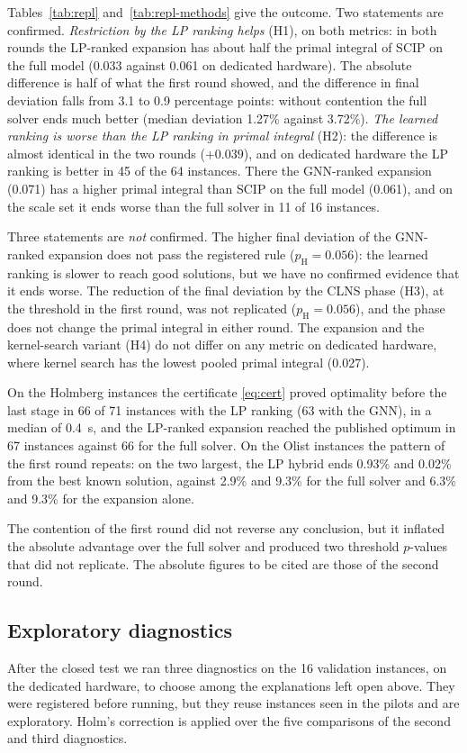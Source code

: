 Tables~\ref{tab:repl} and~\ref{tab:repl-methods} give the outcome. Two statements are confirmed.
\emph{Restriction by the LP ranking helps} (H1), on both metrics: in both rounds the LP-ranked
expansion has about half the primal integral of SCIP on the full model (0.033 against 0.061 on
dedicated hardware). The absolute difference is half of what the first round showed, and the
difference in final deviation falls from 3.1 to 0.9 percentage points: without contention the
full solver ends much better (median deviation 1.27\% against 3.72\%). \emph{The learned ranking
is worse than the LP ranking in primal integral} (H2): the difference is almost identical in the
two rounds ($+0.039$), and on dedicated hardware the LP ranking is better in 45 of the 64
instances. There the GNN-ranked expansion (0.071) has a higher primal integral than SCIP on the
full model (0.061), and on the scale set it ends worse than the full solver in 11 of 16
instances.

Three statements are \emph{not} confirmed. The higher final deviation of the GNN-ranked expansion
does not pass the registered rule ($p_{\mathrm{H}}=0.056$): the learned ranking is slower to reach
good solutions, but we have no confirmed evidence that it ends worse. The reduction of the final
deviation by the CLNS phase (H3), at the threshold in the first round, was not replicated
($p_{\mathrm{H}}=0.056$), and the phase does not change the primal integral in either round. The
expansion and the kernel-search variant (H4) do not differ on any metric on dedicated hardware,
where kernel search has the lowest pooled primal integral (0.027).

On the Holmberg instances the certificate \eqref{eq:cert} proved optimality before the last
stage in 66 of 71 instances with the LP ranking (63 with the GNN), in a median of 0.4~s, and the
LP-ranked expansion reached the published optimum in 67 instances against 66 for the full solver.
On the Olist instances the pattern of the first round repeats: on the two largest, the LP hybrid
ends 0.93\% and 0.02\% from the best known solution, against 2.9\% and 9.3\% for the full solver
and 6.3\% and 9.3\% for the expansion alone.

The contention of the first round did not reverse any conclusion, but it inflated the absolute
advantage over the full solver and produced two threshold $p$-values that did not replicate. The
absolute figures to be cited are those of the second round.

\subsection{Exploratory diagnostics}\label{sec:res-diag}
After the closed test we ran three diagnostics on the 16 validation instances, on the dedicated
hardware, to choose among the explanations left open above. They were registered before running,
but they reuse instances seen in the pilots and are exploratory. Holm's correction is applied over
the five comparisons of the second and third diagnostics.

